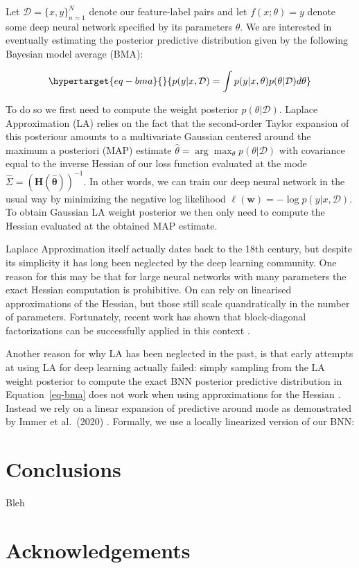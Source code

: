 \documentclass[
  letterpaper,
  DIV=11,
  numbers=noendperiod]{scrartcl}
\begin{document}
Let \(\mathcal{D}=\{x,y\}_{n=1}^N\) denote our feature-label pairs and
let \(f(x;\theta)=y\) denote some deep neural network specified by its
parameters \(\theta\). We are interested in eventually estimating the
posterior predictive distribution given by the following Bayesian model
average (BMA):

\begin{equation}\protect\hypertarget{eq-bma}{}{
p(y|x,\mathcal{D}) = \int p(y|x,\theta)p(\theta|\mathcal{D})d\theta
}\label{eq-bma}\end{equation}

To do so we first need to compute the weight posterior
\(p(\theta|\mathcal{D})\). Laplace Approximation (LA) relies on the fact
that the second-order Taylor expansion of this posteriour amounts to a
multivariate Gaussian centered around the maximum a posteriori (MAP)
estimate \(\hat{\theta}=\arg\max_{\theta}p(\theta|\mathcal{D})\) with
covariance equal to the inverse Hessian of our loss function evaluated
at the mode \(\hat{\Sigma}=(\mathbf{H}(\mathbf{\hat{\theta}}))^{-1}\).
In other words, we can train our deep neural network in the usual way by
minimizing the negative log likelihood
\(\ell(\mathbf{w})=-\log p(y|x,\mathcal{D})\). To obtain Gaussian LA
weight posterior we then only need to compute the Hessian evaluated at
the obtained MAP estimate.

Laplace Approximation itself actually dates back to the 18th century,
but despite its simplicity it has long been neglected by the deep
learning community. One reason for this may be that for large neural
networks with many parameters the exact Hessian computation is
prohibitive. On can rely on linearised approximations of the Hessian,
but those still scale quandratically in the number of parameters.
Fortunately, recent work has shown that block-diagonal factorizations
can be successfully applied in this context \cite{daxberger2021laplace}.

Another reason for why LA has been neglected in the past, is that early
attempts at using LA for deep learning actually failed: simply sampling
from the LA weight posterior to compute the exact BNN posterior
predictive distribution in Equation~\ref{eq-bma} does not work when
using approximations for the Hessian \cite{lawrence2001variational}.
Instead we rely on a linear expansion of predictive around mode as
demonstrated by Immer et al.~(2020) \cite{immer2020improving}. Formally,
we use a locally linearized version of our BNN:

\hypertarget{sec-con}{%
\section{Conclusions}\label{sec-con}}

Bleh

\hypertarget{sec-ack}{%
\section{Acknowledgements}\label{sec-ack}}
\end{document}
